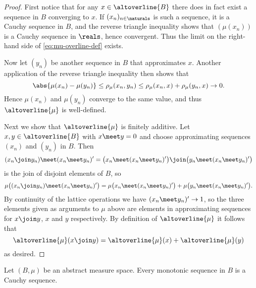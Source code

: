 \documentclass[article, a4paper, 11pt, oneside]{memoir}
\numberwithin{equation}{chapter}
\begin{document}
\begin{proof}
    First notice that for any $x \in \altoverline{B}$ there does in fact exist a sequence in $B$ converging to $x$. If $(x_n)_{n\in\naturals}$ is such a sequence, it is a Cauchy sequence in $B$, and the reverse triangle inequality shows that $(\mu(x_n))$ is a Cauchy sequence in $\reals$, hence convergent. Thus the limit on the right-hand side of \eqref{eq:mu-overline-def} exists.
    
    Now let $(y_n)$ be another sequence in $B$ that approximates $x$. Another application of the reverse triangle inequality then shows that
    \begin{equation*}
        \abs{ \mu(x_n) - \mu(y_n) }
            \leq \rho_\mu(x_n,y_n)
            \leq \rho_\mu(x_n,x) + \rho_\mu(y_n,x)
            \to 0.
    \end{equation*}
    Hence $\mu(x_n)$ and $\mu(y_n)$ converge to the same value, and thus $\altoverline{\mu}$ is well-defined.

    Next we show that $\altoverline{\mu}$ is finitely additive. Let $x,y \in \altoverline{B}$ with $x \meet y = 0$ and choose approximating sequences $(x_n)$ and $(y_n)$ in $B$. Then
    \begin{equation*}
        (x_n \join y_n) \meet (x_n \meet y_n)'
            = \bigl( x_n \meet (x_n \meet y_n)' \bigr)
              \join \bigl( y_n \meet (x_n \meet y_n)' \bigr)
    \end{equation*}
    is the join of disjoint elements of $B$, so
    \begin{equation*}
        \mu \bigl( (x_n \join y_n) \meet (x_n \meet y_n)' \bigr)
            = \mu \bigl( x_n \meet (x_n \meet y_n)' \bigr)
              + \mu \bigl( y_n \meet (x_n \meet y_n)' \bigr).
    \end{equation*}
    By continuity of the lattice operations we have $(x_n \meet y_n)' \to 1$, so the three elements given as arguments to $\mu$ above are elements in approximating sequences for $x \join y$, $x$ and $y$ respectively. By definition of $\altoverline{\mu}$ it follows that
    \begin{equation*}
        \altoverline{\mu}(x \join y)
            = \altoverline{\mu}(x) + \altoverline{\mu}(y)
    \end{equation*}
    as desired.
\end{proof}


\begin{lemma}
    \label{thm:monotonic-sequence-Cauchy}
    Let $(B,\mu)$ be an abstract measure space. Every monotonic sequence in $B$ is a Cauchy sequence.
\end{lemma}
\end{document}
